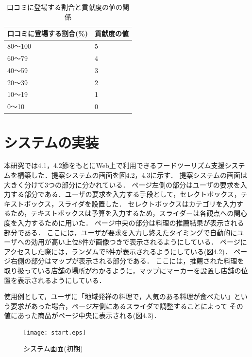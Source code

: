 \documentclass{funthesis}
\begin{document}
\begin{table}[htb]
  \begin{center}
  \scriptsize
    \caption{口コミに登場する割合と貢献度の値の関係}
    \normalsize
   \begin{tabular}{p{6cm}|p{6cm}}
    \hline
口コミに登場する割合(\%) & 貢献度の値 \\ \hline\hline
      80〜100 & 5  \\ \hline
      60〜79 & 4 \\ \hline
      40〜59 & 3 \\ \hline
      20〜39 & 2 \\ \hline
      10〜19 & 1 \\ \hline
      0〜10 & 0 \\ \hline
  \end{tabular}
  \end{center}
\end{table}

\section{システムの実装}
本研究では4.1，4.2節をもとにWeb上で利用できるフードツーリズム支援システムを構築した．提案システムの画面を図4.2，4.3に示す．
提案システムの画面は大きく分けて3つの部分に分かれている．
ページ左側の部分はユーザの要求を入力する部分である．ユーザの要求を入力する手段として，セレクトボックス，テキストボックス，スライダを設置した．
セレクトボックスはカテゴリを入力するため，テキストボックスは予算を入力するため，スライダーは各観点への関心度を入力するために用いた．
ページ中央の部分は料理の推薦結果が表示される部分である．
ここには，ユーザが要求を入力し終えたタイミングで自動的にユーザへの効用が高い上位8件が画像つきで表示されるようにしている．
ページにアクセスした際には，ランダムで8件が表示されるようにしている(図4.2)．
ページ右側の部分はマップが表示される部分である．
ここには，推薦された料理を取り扱っている店舗の場所がわかるように，マップにマーカーを設置し店舗の位置を表示されるようにしている．

使用例として，ユーザに「地域発祥の料理で，人気のある料理が食べたい」という要求があった場合，ページ左側にあるスライダで調整することによって
その値にあった商品がページ中央に表示される(図4.3)．

\begin{figure}[tbp]
  \begin{center}
    \texttt{[image: start.eps]}
    \caption{システム画面(初期)}
  \end{center}
\end{figure}
\end{document}
